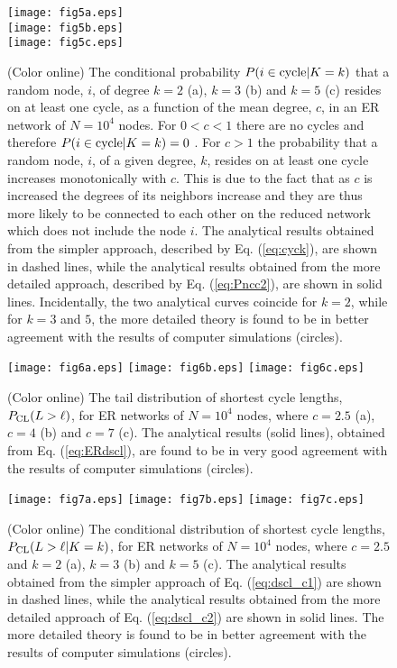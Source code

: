 \documentclass[preprint,pre,superscriptaddress,showpacs]{revtex4}
\begin{document}
\begin{figure}
\texttt{[image: fig5a.eps]} \\
\texttt{[image: fig5b.eps]} \\
\texttt{[image: fig5c.eps]}
\caption{
(Color online)
The conditional probability $P(i \in {\rm cycle} | K=k)$ 
that a random node, $i$, 
of degree $k=2$ (a), $k=3$ (b) and $k=5$ (c) 
resides on at least one cycle, 
as a function of the mean degree, $c$,
in an ER network of $N=10^4$ nodes.
For $0 < c < 1$ there are no cycles and therefore
$P(i \in {\rm cycle} | K=k)=0$ .
For $c > 1$ the probability that a random node, $i$, of
a given degree, $k$, resides on at least one cycle increases monotonically with $c$.
This is due to the fact that as $c$ is increased the degrees of its neighbors increase
and they are thus more likely to be connected to each other on the reduced network
which does not include the node $i$.
The analytical results 
obtained from the
simpler approach, 
described by
Eq. (\ref{eq:cyck}), 
are shown in dashed lines,
while the analytical results obtained from 
the more detailed approach, 
described by
Eq. (\ref{eq:Pncc2}), 
are shown in solid lines.
Incidentally, the two analytical curves coincide for $k=2$,
while for $k=3$ and $5$, the more detailed theory is found to
be in better agreement with the
results of computer simulations (circles).
}
\label{fig:5}
\end{figure}




\begin{figure}
\texttt{[image: fig6a.eps]}
\texttt{[image: fig6b.eps]}
\texttt{[image: fig6c.eps]}
\caption{
(Color online)
The tail distribution of shortest cycle lengths, $P_{\rm CL}(L>\ell)$,
for ER networks of $N=10^{4}$ nodes,
where $c=2.5$ (a), $c=4$ (b) and $c=7$ (c).
The analytical results (solid lines),
obtained from Eq. (\ref{eq:ERdscl}),
are found to be in very good agreement with the results of computer 
simulations (circles).
}
\label{fig:6}
\end{figure}


\begin{figure}
\texttt{[image: fig7a.eps]}
\texttt{[image: fig7b.eps]}
\texttt{[image: fig7c.eps]}
\caption{
(Color online)
The conditional distribution of shortest cycle lengths,
$P_{\rm CL}(L>\ell | K=k)$,
for ER networks of $N=10^{4}$ nodes,
where $c=2.5$ and $k=2$ (a), $k=3$ (b) and $k=5$ (c).
The analytical results 
obtained from the
simpler approach of
Eq. (\ref{eq:dscl_c1}) are shown in dashed lines,
while the analytical results obtained from 
the more detailed approach of
Eq. (\ref{eq:dscl_c2}) are
shown in solid lines.
The more detailed theory is found to
be in better agreement with the
results of computer simulations (circles).
}
\label{fig:7}
\end{figure}
\end{document}
